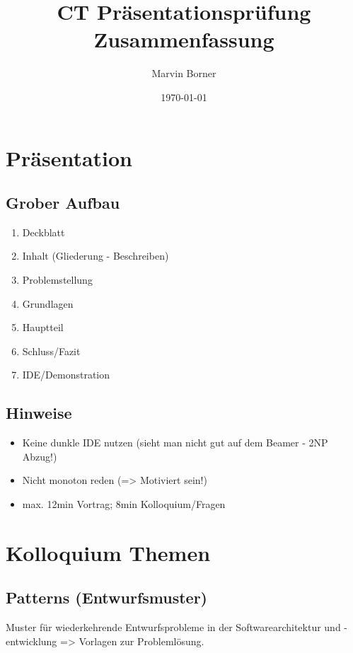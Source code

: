\documentclass[a4paper, 11pt]{article}
\begin{document}
\title{\vspace{-2.0cm}CT Präsentationsprüfung\\Zusammenfassung}
\author{Marvin Borner}
\date{\today}

\maketitle


\section{Präsentation}
\subsection{Grober Aufbau}

\begin{enumerate}
	\item Deckblatt
	\item Inhalt (Gliederung - Beschreiben)
	\item Problemstellung
	\item Grundlagen
	\item Hauptteil
	\item Schluss/Fazit
	\item IDE/Demonstration
\end{enumerate}

\subsection{Hinweise}
\begin{itemize}
	\item Keine dunkle IDE nutzen (sieht man nicht gut auf dem Beamer - 2NP Abzug!)
	\item Nicht monoton reden (=> Motiviert sein!)
	\item max. 12min Vortrag; 8min Kolloquium/Fragen
\end{itemize}

\section{Kolloquium Themen}

\subsection{Patterns (Entwurfsmuster)}
Muster für wiederkehrende Entwurfsprobleme in der Softwarearchitektur und -entwicklung => Vorlagen zur Problemlösung.
\end{document}
